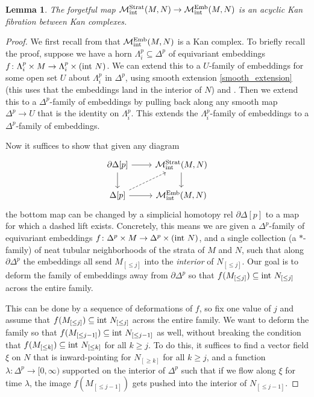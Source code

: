 \documentclass[11pt]{amsart}
\newtheorem{lem}{Lemma}[section]
\theoremstyle{definition}
\numberwithin{equation}{section}
\numberwithin{figure}{section}
\newcommand{\mc}{\mathcal}
\newcommand{\Man}{\mc M^\mathrm{Emb}}
\newcommand{\Manstr}{\mc M^\mathrm{Strat}}
\begin{document}
\begin{lem}\label{manstr1}
 	The forgetful map $\Manstr_{\textup{int}}(M,N) \to \Man_{\textup{int}}(M,N)$ is an acyclic Kan fibration between Kan complexes.
\end{lem}
 
\begin{proof}
	We first recall from \cite[Thm 6.13]{GIMM1} that $\Man_{\textup{int}}(M,N)$ is a Kan complex. To briefly recall the proof, suppose we have a horn $\Lambda^p_i \subseteq \Delta^p$ of equivariant embeddings $f\colon \Lambda^p_i \times M \to \Lambda^p_i \times (\textup{int }N)$. We can extend this to a $U$-family of embeddings for some open set $U$ about $\Lambda^p_i$ in $\Delta^p$, using smooth extension \autoref{smooth_extension} (this uses that the embeddings land in the interior of $N$) and \cite[Lem 2.18]{GIMM1}. Then we extend this to a $\Delta^p$-family of embeddings by pulling back along any smooth map $\Delta^p \to U$ that is the identity on $\Lambda^p_i$. This extends the $\Lambda^p_i$-family of embeddings to a $\Delta^p$-family of embeddings.
 	
 	Now it suffices to show that given any diagram
 	\[ \begin{tikzcd}
 		\partial \Delta[p] \dar \rar & \Manstr_{\textup{int}}(M,N) \dar \\
 		\Delta[p] \rar \ar[dashed]{ur} & \Man_{\textup{int}}(M,N)
	\end{tikzcd} \]
	the bottom map can be changed by a simplicial homotopy rel $\partial \Delta[p]$ to a map for which a dashed lift exists. Concretely, this means we are given a $\Delta^p$-family of equivariant embeddings $f\colon \Delta^p \times M \to \Delta^p \times (\textup{int }N)$, and a single collection (a $*$-family) of neat tubular neighborhoods of the strata of $M$ and $N$, such that along $\partial\Delta^p$ the embeddings all send $M_{[\leq j]}$ into the \emph{interior} of $N_{[\leq j]}$. Our goal is to deform the family of embeddings away from $\partial\Delta^p$ so that $f(M_{[\leq j]}) \subseteq \textup{int }N_{[\leq j]}$ across the entire family.
	
	This can be done by a sequence of deformations of $f$, so fix one value of $j$ and assume that $f(M_{[\leq j]}) \subseteq \textup{int }N_{[\leq j]}$ across the entire family. We want to deform the family so that $f(M_{[\leq j-1]}) \subseteq \textup{int }N_{[\leq j-1]}$ as well, without breaking the condition that $f(M_{[\leq k]}) \subseteq \textup{int }N_{[\leq k]}$ for all $k \geq j$. To do this, it suffices to find a vector field $\xi$ on $N$ that is inward-pointing for $N_{[\geq k]}$ for all $k \geq j$, and a function $\lambda \colon \Delta^p \to [0,\infty)$ supported on the interior of $\Delta^p$ such that if we flow along $\xi$ for time $\lambda$, the image $f(M_{[\leq j-1]})$ gets pushed into the interior of $N_{[\leq j-1]}$.
	

\end{proof}
\end{document}
